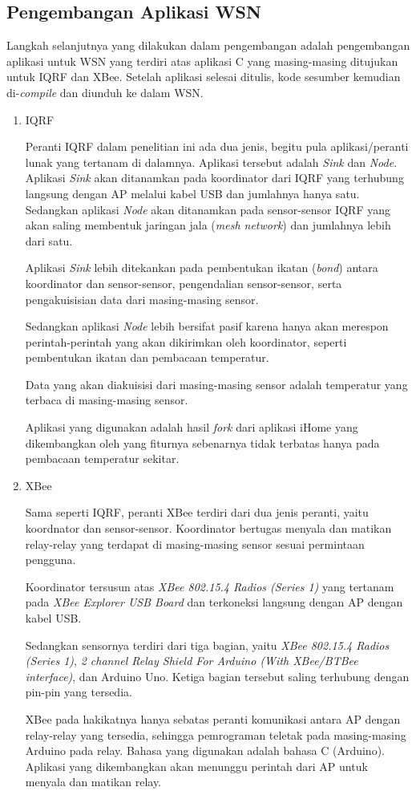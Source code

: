 		\subsection{Pengembangan Aplikasi WSN}
			Langkah selanjutnya yang dilakukan dalam pengembangan adalah pengembangan aplikasi untuk WSN yang terdiri atas aplikasi C yang masing-masing ditujukan untuk IQRF dan XBee. Setelah aplikasi selesai ditulis, kode sesumber kemudian di-\emph{compile} dan diunduh ke dalam WSN.

			\begin{enumerate}
				\item IQRF

					Peranti IQRF dalam penelitian ini ada dua jenis, begitu pula aplikasi/peranti lunak yang tertanam di dalamnya. Aplikasi tersebut adalah \emph{Sink} dan \emph{Node}. Aplikasi \emph{Sink} akan ditanamkan pada koordinator dari IQRF yang terhubung langsung dengan AP melalui kabel USB dan jumlahnya hanya satu. Sedangkan aplikasi \emph{Node} akan ditanamkan pada sensor-sensor IQRF yang akan saling membentuk jaringan jala (\emph{mesh network}) dan jumlahnya lebih dari satu.

					Aplikasi \emph{Sink} lebih ditekankan pada pembentukan ikatan (\emph{bond}) antara koordinator dan sensor-sensor, pengendalian sensor-sensor, serta pengakuisisian data dari masing-masing sensor.

					Sedangkan aplikasi \emph{Node} lebih bersifat pasif karena hanya akan merespon perintah-perintah yang akan dikirimkan oleh koordinator, seperti pembentukan ikatan dan pembacaan temperatur.

					Data yang akan diakuisisi dari masing-masing sensor adalah temperatur yang terbaca di masing-masing sensor.

					Aplikasi yang digunakan adalah hasil \emph{fork} dari aplikasi iHome yang dikembangkan oleh \cite{widyawan2012ihome} yang fiturnya sebenarnya tidak terbatas hanya pada pembacaan temperatur sekitar.

				\item XBee

					Sama seperti IQRF, peranti XBee terdiri dari dua jenis peranti, yaitu koordnator dan sensor-sensor. Koordinator bertugas menyala dan matikan relay-relay yang terdapat di masing-masing sensor sesuai permintaan pengguna.

					Koordinator tersusun atas \emph{XBee 802.15.4 Radios (Series 1)} yang tertanam pada \emph{XBee Explorer USB Board} dan terkoneksi langsung dengan AP dengan kabel USB.

					Sedangkan sensornya terdiri dari tiga bagian, yaitu \emph{XBee 802.15.4 Radios (Series 1)}, \emph{2 channel Relay Shield For Arduino (With XBee/BTBee interface)}, dan Arduino Uno. Ketiga bagian tersebut saling terhubung dengan pin-pin yang tersedia.

					XBee pada hakikatnya hanya sebatas peranti komunikasi antara AP dengan relay-relay yang tersedia, sehingga pemrograman teletak pada masing-masing Arduino pada relay. Bahasa yang digunakan adalah bahasa C (Arduino). Aplikasi yang dikembangkan akan menunggu perintah dari AP untuk menyala dan matikan relay.

			\end{enumerate}

